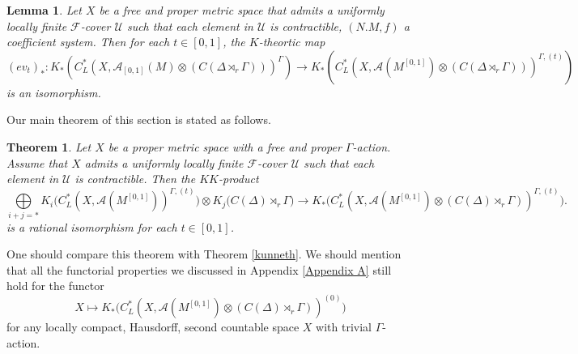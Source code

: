 \documentclass[11pt]{article}
\theoremstyle{definition}
\theoremstyle{plain}
\newtheorem{Thm}[Def]{Theorem}
\newtheorem{Lem}[Def]{Lemma}
\def\A{\mathcal A}\def\C{\mathcal C}\def\B{\mathcal B}\def\E{\mathcal E}\def\O{\mathcal O}\def\h{\mathfrak h}\def\K{\mathcal K}\def\F{\mathcal F}\def\P{\mathcal P}\def\L{\mathcal L}\def\R{\mathcal R}\def\Q{\mathcal Q}\def\H{\mathcal H}\def\S{\mathcal S}\def\N{\mathcal N}\def\U{\mathcal U}\def\V{\mathcal V}
\def\ox{\otimes}
\def\ox{\otimes}
\def\Ga{\Gamma}
\begin{document}
\begin{Lem}\label{independent on t}
Let $X$ be a free and proper metric space that admits a uniformly locally finite $\F$-cover $\U$ such that each element in $\U$ is contractible, $(N.M,f)$ a coefficient system. Then for each $t\in[0,1]$, the $K$-theortic map
$$(ev_t)_*:K_*\left(C^*_L\left(X,\A_{[0,1]}(M)\ox(C(\Delta\rtimes_r\Ga))\right)^{\Ga}\right)\to K_*\left(C^*_L\left(X,\A(M^{[0,1]})\ox(C(\Delta\rtimes_r\Ga))\right)^{\Ga,(t)}\right)$$
is an isomorphism.
\end{Lem}



Our main theorem of this section is stated as follows.

\begin{Thm}\label{Kunneth formula}
Let $X$ be a proper metric space with a free and proper $\Ga$-action. Assume that $X$ admits a uniformly locally finite $\F$-cover $\U$ such that each element in $\U$ is contractible. Then the $KK$-product
$$\bigoplus\limits_{i+j=*} K_{i}\Big( C_L^*\left(X,\mathcal{A}(M^{[0,1]}) \right)^{\Gamma,(t)} \Big) \otimes K_{j} \Big( C(\Delta) \rtimes_r \Gamma  \Big)\to K_*\Big(C^*_L\left(X,\A(M^{[0,1]})\ox(C(\Delta)\rtimes_r\Ga)\right)^{\Ga,(t)}\Big).$$
is a rational isomorphism for each $t\in [0,1]$.
\end{Thm}

One should compare this theorem with Theorem \ref{kunneth}. We should mention that all the functorial properties we discussed in Appendix \ref{Appendix A} still hold for the functor
$$X\mapsto K_*\Big(C^*_L\left(X,\A(M^{[0,1]})\ox(C(\Delta)\rtimes_r\Ga)\right)^{(0)}\Big)$$
for any locally compact, Hausdorff, second countable space $X$ with trivial $\Ga$-action.
\end{document}
